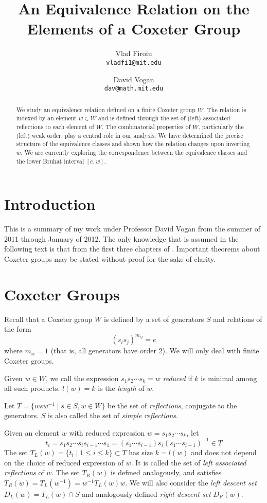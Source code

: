 \documentclass[11pt]{article}
\title{An Equivalence Relation on the Elements of a Coxeter Group}
\author{
Vlad Firoiu\\
\texttt{vladfi1@mit.edu}
\and
David Vogan\\
\texttt{dav@math.mit.edu}
}
\theoremstyle{definition}
\theoremstyle{definition}
\begin{document}
\maketitle

\begin{abstract}
We study an equivalence relation defined on a finite Coxeter group $W$. The relation is indexed by an element $w\in W$ and is defined through the set of (left) associated reflections to each element of $W$. The combinatorial properties of $W$, particularly the (left) weak order, play a central role in our analysis. We have determined the precise structure of the equivalence classes and shown how the relation changes upon inverting $w$. We are currently exploring the correspondence between the equivalence classes and the lower Bruhat interval $[e, w]$.
\end{abstract}

\section{Introduction}
This is a summary of my work under Professor David Vogan from the summer of 2011 through January of 2012. The only knowledge that is assumed in the following text is that from the first three chapters of \cite{BB}. Important theorems about Coxeter groups may be stated without proof for the sake of clarity.

\section{Coxeter Groups}
Recall that a Coxeter group $W$ is defined by a set of generators $S$ and relations of the form
\[
(s_i s_j)^{m_{ij}} = e
\]
where $m_{ii}=1$ (that is, all generators have order 2). We will only deal with finite Coxeter groups.

Given $w \in W$, we call the expression $s_1s_2\cdots s_k = w$ \emph{reduced} if $k$ is minimal among all such products. $l(w) = k$ is the \emph{length} of $w$.

Let $T = \{wsw^{-1} \mid s\in S, w \in W\}$ be the set of \emph{reflections}, conjugate to the generators. $S$ is also called the set of \emph{simple reflections}.

Given an element $w$ with reduced expression $w = s_1s_2\cdots s_k$, let
\[
t_i = s_1s_2\cdots s_is_{i-1}\cdots s_1 = (s_1\cdots s_{i-1}) s_i (s_1\cdots s_{i-1})^{-1} \in T
\]
The set $T_L(w) = \{t_i \mid 1\leq i\leq k\} \subset T$ has size $k = l(w)$ and does not depend on the choice of reduced expression of $w$. It is called the set of \emph{left associated reflections} of $w$. The set $T_R(w)$ is defined analogously, and satisfies $T_R(w) = T_L(w^{-1}) = w^{-1}T_L(w)w$. We will also consider the \emph{left descent set} $D_L(w) = T_L(w) \cap S$ and analogously defined \emph{right descent set} $D_R(w)$.
\end{document}
